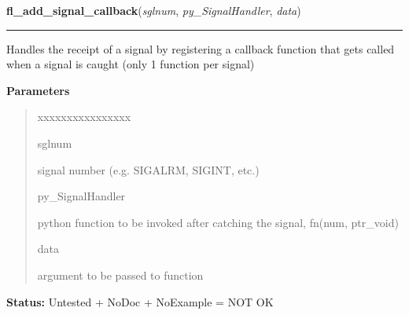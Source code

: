     \vspace{0.5ex}

\hspace{.8\funcindent}\begin{boxedminipage}{\funcwidth}

    \raggedright \textbf{fl\_add\_signal\_callback}(\textit{sglnum}, \textit{py\_SignalHandler}, \textit{data})

    \vspace{-1.5ex}

    \rule{\textwidth}{0.5\fboxrule}
\setlength{\parskip}{2ex}
    Handles the receipt of a signal by registering a callback function that
    gets called when a signal is caught (only 1 function per signal)

\setlength{\parskip}{1ex}
      \textbf{Parameters}
      \vspace{-1ex}

      \begin{quote}
        \begin{Ventry}{xxxxxxxxxxxxxxxx}

          \item[sglnum]

          signal number (e.g. SIGALRM, SIGINT, etc.)

          \item[py\_SignalHandler]

          python function to be invoked after catching the signal, fn(num, 
          ptr\_void)

          \item[data]

          argument to be passed to function

        \end{Ventry}

      \end{quote}

\textbf{Status:} Untested + NoDoc + NoExample = NOT OK



    \end{boxedminipage}

    \label{xformslib:library:fl_remove_signal_callback}

    \vspace{0.5ex}

